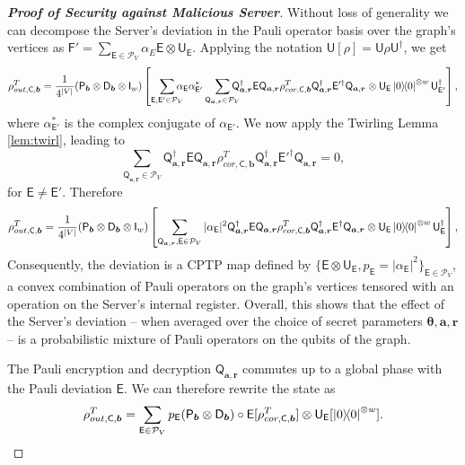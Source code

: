 \documentclass[12pt]{iopart}
\newcommand{\cptp}[1]{\mathsf{#1}} \newcommand{\pd}[1]{\mathcal{#1}}  \newcommand{\sch}[1]{\bm{#1}}
\newcommand{\Id}{\cptp{I}}
\renewcommand{\1}{\mathds{1}}
\begin{document}
\begin{proof}[\bf Proof of Security against Malicious Server]
Without loss of generality we can decompose the Server's deviation in the Pauli operator basis over the graph's vertices as $\cptp F' = \sum_{\cptp E \in \mathcal P_V} \alpha_E \cptp E \otimes \cptp U_{\cptp E}$. Applying the notation $\cptp U[\rho] = \cptp U\rho\cptp U^\dagger$, we get
\begin{align}
\rho_{out, \cptp C, \bm{b}}^T = \frac{1}{4^{|V|}} (\cptp P_{\bm{b}}\otimes \cptp D_{\bm{b}}\otimes\Id_w)\left[ \smashoperator[r]{\sum_{\cptp E, \cptp E' \in \mathcal P_V}} \alpha_{\cptp E}\alpha_{\cptp E'}^* \smashoperator[r]{\sum_{\cptp Q_{\bm{a}, \bm{r}} \in \mathcal P_V}}\cptp Q_{\bm{a}, \bm{r}}^\dagger \cptp E \cptp Q_{\bm{a}, \bm{r}} \rho_{cor, \cptp C, \bm{b}}^T \cptp Q_{\bm{a}, \bm{r}}^\dagger \cptp E'^\dagger \cptp Q_{\bm{a}, \bm{r}} \otimes \cptp U_{\cptp E}\dyad{0}^{\otimes w}\cptp U_{\cptp E'}^\dagger \right],
\end{align}
where $\alpha_{\cptp E'}^*$ is the complex conjugate of $\alpha_{\cptp E'}$. We now apply the Twirling Lemma \ref{lem:twirl}, leading to
\begin{equation}
\sum_{\cptp Q_{\bm{a}, \bm{r}} \in \mathcal P_V}\cptp Q_{\bm{a}, \bm{r}}^\dagger \cptp E \cptp Q_{\bm{a}, \bm{r}} \rho_{cor, \cptp C, \bm{b}}^T \cptp Q_{\bm{a}, \bm{r}}^\dagger \cptp E'^\dagger \cptp Q_{\bm{a}, \bm{r}} = 0,
\end{equation}
for $\cptp E \neq \cptp E'$. Therefore
\begin{align}
\rho_{out, \cptp C, \bm{b}}^T = \frac{1}{4^{|V|}} (\cptp P_{\bm{b}}\otimes \cptp D_{\bm{b}}\otimes\Id_w)\left[ \sum_{\cptp Q_{\bm{a}, \bm{r}}, \cptp E \in \mathcal P_V} |\alpha_{\cptp E}|^2 \cptp Q_{\bm{a}, \bm{r}}^\dagger \cptp E \cptp Q_{\bm{a}, \bm{r}} \rho_{cor, \cptp C, \bm{b}}^T \cptp Q_{\bm{a}, \bm{r}}^\dagger \cptp E^\dagger \cptp Q_{\bm{a}, \bm{r}} \otimes \cptp U_{\cptp E}\dyad{0}^{\otimes w}\cptp U_{\cptp E}^\dagger \right],
\end{align}
Consequently, the deviation is a CPTP map defined by $\{\cptp E \otimes \cptp U_{\cptp E}, p_{\cptp E} = |\alpha_{\cptp E}|^2\}_{\cptp E \in \mathcal P_V}$, a convex combination of Pauli operators on the graph's vertices tensored with an operation on the Server's internal register.
Overall, this shows that the effect of the Server's deviation -- when averaged over the choice of secret parameters $\bm{\theta}, \bm{a}, \bm {r}$ -- is a probabilistic mixture of Pauli operators on the qubits of the graph.

The Pauli encryption and decryption $\cptp Q_{\bm{a}, \bm{r}}$ commutes up to a global phase with the Pauli deviation $\cptp E$. We can therefore rewrite the state as
\begin{align}
\rho_{out, \cptp C, \bm{b}}^T = \sum_{\cptp E \in \mathcal P_V} p_{\cptp E} (\cptp P_{\bm{b}}\otimes \cptp D_{\bm{b}})\circ\cptp E [\rho_{cor, \cptp C, \bm{b}}^T] \otimes \cptp U_{\cptp E}[\dyad{0}^{\otimes w}].
\end{align}


\end{proof}
\end{document}
